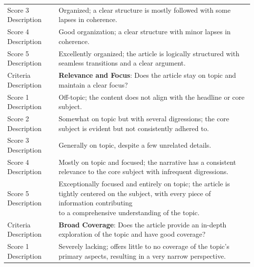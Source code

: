 \documentclass[11pt]{article}
\begin{document}
\begin{table}
{\begin{tabular}{ll}
Score 3 Description  & Organized; a clear structure is mostly followed with some lapses in coherence.                                                                                                 \\
Score 4 Description  & Good organization; a clear structure with minor lapses in coherence.                                                                                                                      \\
Score 5 Description  & Excellently organized; the article is logically structured with seamless transitions and a clear argument.                                                                                \\ 
\midrule
Criteria Description & \textbf{Relevance and Focus}: Does the article stay on topic and maintain a clear focus?                                                                                                  \\
Score 1 Description  & Off-topic; the content does not align with the headline or core subject.                                                                                                                  \\
Score 2 Description  & Somewhat on topic but with several digressions; the core subject is evident but not consistently adhered to.                                                                              \\
Score 3 Description  & Generally on topic, despite a few unrelated details.                                                                                                                                      \\
Score 4 Description  & Mostly on topic and focused; the narrative has a consistent relevance to the core subject with infrequent digressions.                                                                    \\
Score 5 Description  & \makecell[l]{Exceptionally focused and entirely on topic; the article is tightly centered on the subject, with every piece of information contributing \\to a comprehensive understanding of the topic.}  \\ 
\midrule
Criteria Description & \textbf{Broad Coverage}: Does the article provide an in-depth exploration of the topic and have good coverage?                                                                            \\
Score 1 Description  & Severely lacking; offers little to no coverage of the topic's primary aspects, resulting in a very narrow perspective.                                                                    \\

\end{tabular}}
\end{table}
\end{document}
